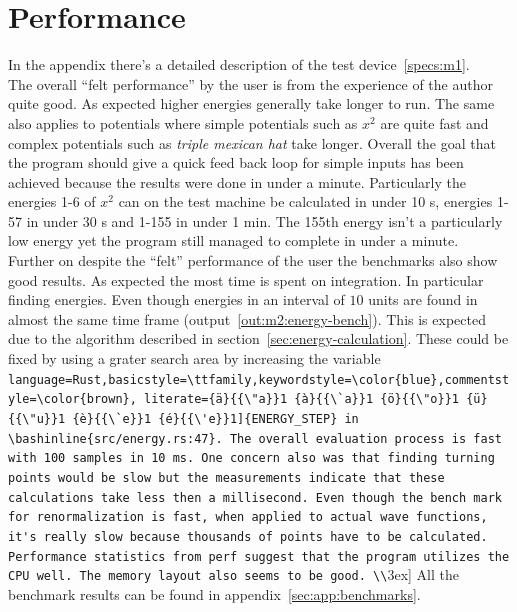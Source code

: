 \documentclass[11pt,DIV=10,final]{scrreprt} %
\providecommand{\rustinline}{\lstinline[language=Rust,basicstyle=\ttfamily,keywordstyle=\color{blue},commentstyle=\color{brown}, literate={ä}{{\"a}}1 {à}{{\`a}}1 {ö}{{\"o}}1 {ü}{{\"u}}1 {è}{{\`e}}1 {é}{{\'e}}1]} % für Inline-C++ Code
\providecommand{\bashinline}{\lstinline[language=bash,basicstyle=\ttfamily,keywordstyle=\color{blue},commentstyle=\color{brown}, literate={ä}{{\"a}}1 {à}{{\`a}}1 {ö}{{\"o}}1 {ü}{{\"u}}1 {è}{{\`e}}1 {é}{{\'e}}1]} % für Inline-C++ Code
\begin{document}
{\section{Performance}
In the appendix there's a detailed description of the test device~\ref{specs:m1}.
\\[3ex]
The overall ``felt performance'' by the user is from the experience of the author quite good. As
expected higher energies generally take longer to run. The same also applies to potentials where simple potentials such as $x^{2}$ are quite fast and complex potentials such as \emph{triple mexican hat}
take longer. Overall the goal that the program should give a quick feed back loop for simple inputs has been achieved because the results were done in under a minute. Particularly the energies 1-6 of
$x^{2}$ can on the test machine be calculated in under 10 s, energies 1-57 in under 30 s and 1-155 in under 1 min. The 155th energy isn't a particularly low energy yet the program still managed to
complete in under a minute.
\\[3ex]
Further on despite the ``felt'' performance of the user the benchmarks also show good results. As expected the most time is spent on integration. In particular finding energies. Even though energies in
an interval of $10$ units are found in almost the same time frame (output~\ref{out:m2:energy-bench}). This is expected due to the algorithm described in section~\ref{sec:energy-calculation}. These could
be fixed by using a grater search area by increasing the variable \rustinline{ENERGY_STEP} in \bashinline{src/energy.rs:47}. The overall evaluation process is fast with 100 samples in 10 ms. One concern
also was that finding turning points would be slow but the measurements indicate that these calculations take less then a millisecond. Even though the bench mark for renormalization is fast, when applied
to actual wave functions, it's really slow because thousands of points have to be calculated.

Performance statistics from perf suggest that the program utilizes the CPU well. The memory layout also seems to be good.
\\[3ex]
All the benchmark results can be found in appendix~\ref{sec:app:benchmarks}.


}
\end{document}
